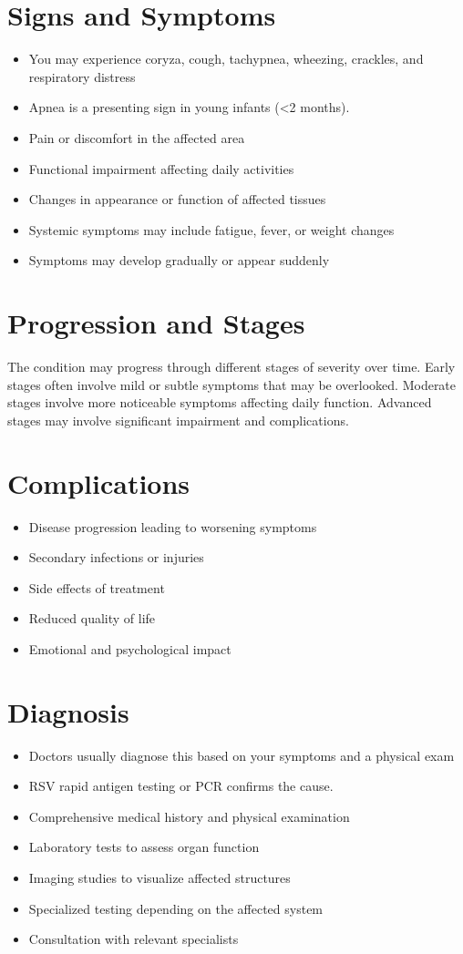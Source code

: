 \section{Signs and Symptoms}
\begin{itemize}[noitemsep]
  \item You may experience coryza, cough, tachypnea, wheezing, crackles, and respiratory distress
  \item Apnea is a presenting sign in young infants (<2 months).
  \item Pain or discomfort in the affected area
  \item Functional impairment affecting daily activities
  \item Changes in appearance or function of affected tissues
  \item Systemic symptoms may include fatigue, fever, or weight changes
  \item Symptoms may develop gradually or appear suddenly
\end{itemize}
\section{Progression and Stages}
The condition may progress through different stages of severity over time. Early stages often involve mild or subtle symptoms that may be overlooked. Moderate stages involve more noticeable symptoms affecting daily function. Advanced stages may involve significant impairment and complications.
\section{Complications}
\begin{itemize}[noitemsep]
  \item Disease progression leading to worsening symptoms
  \item Secondary infections or injuries
  \item Side effects of treatment
  \item Reduced quality of life
  \item Emotional and psychological impact
\end{itemize}
\section{Diagnosis}
\begin{itemize}[noitemsep]
  \item Doctors usually diagnose this based on your symptoms and a physical exam
  \item RSV rapid antigen testing or PCR confirms the cause.
  \item Comprehensive medical history and physical examination
  \item Laboratory tests to assess organ function
  \item Imaging studies to visualize affected structures
  \item Specialized testing depending on the affected system
  \item Consultation with relevant specialists
\end{itemize}
